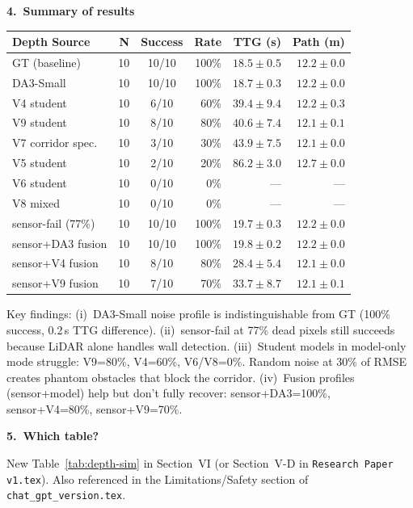 \documentclass[11pt,a4paper]{article}
\begin{document}
\textbf{4.\ Summary of results}

\begin{center}
\footnotesize
\begin{tabular}{lrcrrr}
\toprule
\textbf{Depth Source} & \textbf{N} & \textbf{Success} & \textbf{Rate}
  & \textbf{TTG (s)} & \textbf{Path (m)} \\
\midrule
GT (baseline)     & 10 & 10/10 & 100\% & $18.5 \pm 0.5$ & $12.2 \pm 0.0$ \\
DA3-Small         & 10 & 10/10 & 100\% & $18.7 \pm 0.3$ & $12.2 \pm 0.0$ \\
\midrule
V4 student        & 10 &  6/10 &  60\% & $39.4 \pm 9.4$ & $12.2 \pm 0.3$ \\
V9 student        & 10 &  8/10 &  80\% & $40.6 \pm 7.4$ & $12.1 \pm 0.1$ \\
V7 corridor spec. & 10 &  3/10 &  30\% & $43.9 \pm 7.5$ & $12.1 \pm 0.0$ \\
V5 student        & 10 &  2/10 &  20\% & $86.2 \pm 3.0$ & $12.7 \pm 0.0$ \\
V6 student        & 10 &  0/10 &   0\% & ---             & --- \\
V8 mixed          & 10 &  0/10 &   0\% & ---             & --- \\
\midrule
sensor-fail (77\%)   & 10 & 10/10 & 100\% & $19.7 \pm 0.3$ & $12.2 \pm 0.0$ \\
sensor{+}DA3 fusion  & 10 & 10/10 & 100\% & $19.8 \pm 0.2$ & $12.2 \pm 0.0$ \\
sensor{+}V4 fusion   & 10 &  8/10 &  80\% & $28.4 \pm 5.4$ & $12.1 \pm 0.0$ \\
sensor{+}V9 fusion   & 10 &  7/10 &  70\% & $33.7 \pm 8.7$ & $12.1 \pm 0.1$ \\
\bottomrule
\end{tabular}
\end{center}

Key findings: (i)~DA3-Small noise profile is indistinguishable from GT
(100\% success, 0.2\,s TTG difference).
(ii)~sensor-fail at 77\% dead pixels still succeeds because LiDAR alone
handles wall detection.
(iii)~Student models in model-only mode struggle: V9=80\%, V4=60\%,
V6/V8=0\%.  Random noise at 30\% of RMSE creates phantom obstacles
that block the corridor.
(iv)~Fusion profiles (sensor+model) help but don't fully recover:
sensor+DA3=100\%, sensor+V4=80\%, sensor+V9=70\%.

\textbf{5.\ Which table?}

New Table~\ref{tab:depth-sim} in Section~VI (or Section~V-D in
\texttt{Research Paper v1.tex}).  Also referenced in the
Limitations/Safety section of \texttt{chat\_gpt\_version.tex}.
\end{document}

